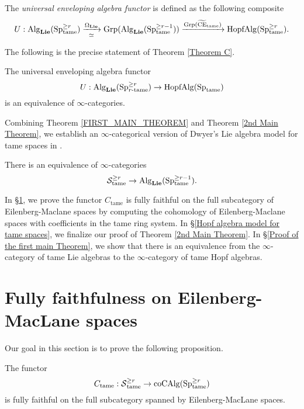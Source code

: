 \begin{definition}
	The \emph{universal enveloping algebra functor} is defined as the following composite
	$$
	U: \operatorname{Alg}_{\mathbf{Lie}}(\operatorname{Sp}^{\geq r}_{\operatorname{\operatorname{tame}}}) 
	\xrightarrow[\simeq]{\Omega_{\mathbf{Lie}}}
	\operatorname{Grp}(\operatorname{Alg}_{\mathbf{Lie}}(\operatorname{Sp}^{\geq r-1}_{\operatorname{\operatorname{tame}}}))
	\xrightarrow{\operatorname{Grp}(\widetilde{\operatorname{CE}}_{\operatorname{\operatorname{tame}}})}
	\operatorname{HopfAlg}(\operatorname{Sp}^{\geq r}_{\operatorname{\operatorname{tame}}}).
	$$
\end{definition}


The following is the precise statement of Theorem \ref{Theorem C}.
\begin{theorem}
\label{FIRST_MAIN_THEOREM}
	The universal enveloping algebra functor
	$$
	U: \operatorname{Alg}_{\mathbf{Lie}}(\operatorname{Sp}^{\geq r}_{\text{$r$-tame}})  
	\to
	\operatorname{HopfAlg}(\operatorname{Sp}_{\operatorname{\operatorname{tame}}})
	$$
	is an equivalence of $\infty$-categories.
\end{theorem}

Combining Theorem \ref{FIRST_MAIN_THEOREM} and Theorem \ref{2nd Main Theorem}, we establish an $\infty$-categorical version of Dwyer's Lie algebra model for tame spaces in \cite{Dwyer}.
\begin{theorem}
\cite{Dwyer}
	There is an equivalence of $\infty$-categories
	\[
	{\mathcal{S}}^{\geq r}_{\operatorname{\operatorname{tame}}} 
	\to
	\operatorname{Alg}_{\mathbf{Lie}}(\operatorname{Sp}^{\geq r-1}_{\operatorname{\operatorname{tame}}}).
	\]
\end{theorem}

In \S \ref{Section: Fully faithfulness on Eilenberg-Maclane spaces}, we prove the functor $C_{\operatorname{tame}}$ is fully faithful on the full subcategory of Eilenberg-Maclane spaces by computing the cohomology of Eilenberg-Maclane spaces with coefficients in the tame ring system.
In \S \ref{Hopf algebra model for tame spaces}, we finalize our proof of Theorem \ref{2nd Main Theorem}.
In \S \ref{Proof of the first main Theorem}, we show that there is an equivalence from the $\infty$-category of tame Lie algebras to the $\infty$-category of tame Hopf algebras. 


\section{Fully faithfulness on Eilenberg-MacLane spaces}\label{Section: Fully faithfulness on Eilenberg-Maclane spaces}

Our goal in this section is to prove the following proposition.
\begin{proposition}
\label{Fully faithfulness of C_tame on EM spaces}
	The functor
	$$
	C_{\operatorname{\operatorname{\operatorname{tame}}}}:\operatorname{\mathcal{S}}^{\geq r}_{\operatorname{\operatorname{tame}}}\to \operatorname{coCAlg}(\operatorname{Sp}^{\geq r}_{\operatorname{\operatorname{tame}}})
	$$
is fully faithful on the full subcategory spanned by Eilenberg-MacLane spaces.
\end{proposition}

